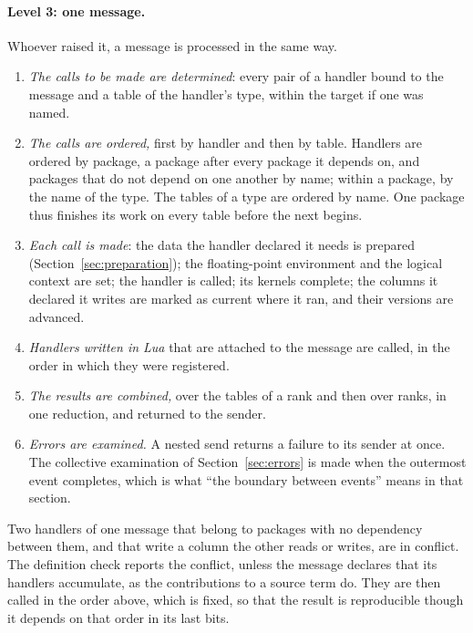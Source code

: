 \documentclass[11pt,a4paper]{article}
\begin{document}
\paragraph{Level 3: one message.}  Whoever raised it, a message is processed
in the same way.

\begin{enumerate}
  \item \emph{The calls to be made are determined}: every pair of a handler
        bound to the message and a table of the handler's type, within the
        target if one was named.
  \item \emph{The calls are ordered,} first by handler and then by table.
        Handlers are ordered by package, a package after every package it
        depends on, and packages that do not depend on one another by name;
        within a package, by the name of the type.  The tables of a type are
        ordered by name.  One package thus finishes its work on every table
        before the next begins.
  \item \emph{Each call is made}: the data the handler declared it needs is
        prepared (Section~\ref{sec:preparation}); the floating-point
        environment and the logical context are set; the handler is called;
        its kernels complete; the columns it declared it writes are marked
        as current where it ran, and their versions are advanced.
  \item \emph{Handlers written in Lua} that are attached to the message are
        called, in the order in which they were registered.
  \item \emph{The results are combined,} over the tables of a rank and then
        over ranks, in one reduction, and returned to the sender.
  \item \emph{Errors are examined.}  A nested send returns a failure to its
        sender at once.  The collective examination of
        Section~\ref{sec:errors} is made when the outermost event completes,
        which is what \enquote{the boundary between events} means in that
        section.
\end{enumerate}

Two handlers of one message that belong to packages with no dependency
between them, and that write a column the other reads or writes, are in
conflict.  The definition check reports the conflict, unless the message
declares that its handlers accumulate, as the contributions to a source
term do.  They are then called in the order above, which is fixed, so that
the result is reproducible though it depends on that order in its last
bits.
\end{document}
